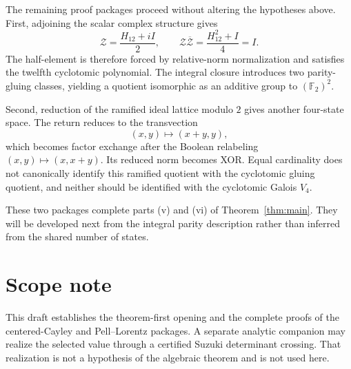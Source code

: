 \documentclass[11pt]{article}
\theoremstyle{definition}
\theoremstyle{remark}
\newcommand{\F}{\mathbb F}
\begin{document}
The remaining proof packages proceed without altering the hypotheses above.
First, adjoining the scalar complex structure gives
\[
\mathcal Z=\frac{H_{12}+iI}{2},
\qquad
\mathcal Z\overline{\mathcal Z}
=\frac{H_{12}^2+I}{4}=I.
\]
The half-element is therefore forced by relative-norm normalization and
satisfies the twelfth cyclotomic polynomial.  The integral closure introduces
two parity-gluing classes, yielding a quotient isomorphic as an additive group
to $(\F_2)^2$.

Second, reduction of the ramified ideal lattice modulo $2$ gives another
four-state space.  The return reduces to the transvection
\[
(x,y)\longmapsto(x+y,y),
\]
which becomes factor exchange after the Boolean relabeling
$(x,y)\mapsto(x,x+y)$.  Its reduced norm becomes XOR.  Equal cardinality does
not canonically identify this ramified quotient with the cyclotomic gluing
quotient, and neither should be identified with the cyclotomic Galois $V_4$.

These two packages complete parts (v) and (vi) of
Theorem~\ref{thm:main}.  They will be developed next from the integral parity
description rather than inferred from the shared number of states.

\section*{Scope note}

This draft establishes the theorem-first opening and the complete proofs of
the centered-Cayley and Pell--Lorentz packages.  A separate analytic companion
may realize the selected value through a certified Suzuki determinant
crossing.  That realization is not a hypothesis of the algebraic theorem and
is not used here.
\end{document}
